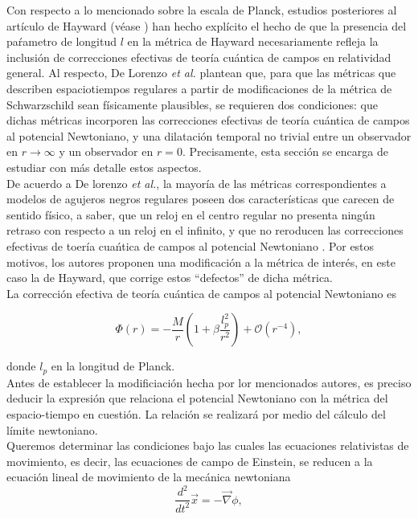 \documentclass{article}
\numberwithin{equation}{section}
\theoremstyle{definition}
\begin{document}
Con respecto a lo mencionado sobre la escala de Planck, estudios posteriores al artículo de Hayward (véase \cite{lorenzo}) han hecho explícito el hecho de que la presencia del paŕametro de longitud $l$ en la métrica de Hayward necesariamente refleja la inclusión de correcciones efectivas de teoría cuántica de campos en relatividad general. Al respecto, De Lorenzo \emph{et al.} plantean que, para que las métricas que describen espaciotiempos regulares a partir de modificaciones de la métrica de Schwarzschild sean físicamente plausibles, se requieren dos condiciones: que dichas métricas incorporen las correcciones efectivas de teoría cuántica  de campos al potencial Newtoniano, y una dilatación temporal no trivial entre un observador en $r \to \infty$ y un observador en $r = 0$. Precisamente, esta sección se encarga de estudiar con más detalle estos aspectos.\\

De acuerdo a De lorenzo \emph{et al.}, la mayoría de las métricas correspondientes a modelos de agujeros negros regulares poseen dos características que carecen de sentido físico, a saber, que un reloj en el centro regular no presenta ningún retraso con respecto a un reloj en el infinito, y que no reroducen las correcciones efectivas de toería cuańtica de campos al potencial Newtoniano \cite{lorenzo}. Por estos motivos, los autores proponen una modificación a la métrica de interés, en este caso la de Hayward, que corrige estos ``defectos'' de dicha métrica.\\

La corrección efectiva de teoría cuántica de campos al potencial Newtoniano es

\begin{equation}
\label{newF}
\Phi (r) = -\frac{M}{r} \left( 1 + \beta \frac{l_{p}^2}{r^2} \right) + \mathcal{O}(r^{-4}),
\end{equation}

donde $l_{p}$ en la longitud de Planck.\\

Antes de establecer la modificiación hecha por lor mencionados autores, es preciso deducir la expresión que relaciona el potencial Newtoniano con la métrica del espacio-tiempo en cuestión. La relación se realizará por medio del cálculo del límite newtoniano.\\

Queremos determinar las condiciones bajo las cuales las ecuaciones relativistas de movimiento, es decir, las ecuaciones de campo de Einstein, se reducen a la ecuación lineal de movimiento de la mecánica newtoniana
\begin{equation*}
\frac{d^2}{dt^2}\vec{x} = - \vec{\nabla}\phi,
\end{equation*}
\end{document}
